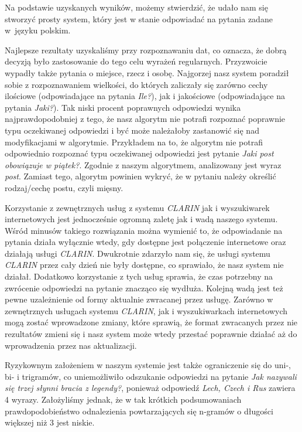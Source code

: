 Na podstawie uzyskanych wyników, możemy stwierdzić, że udało nam się stworzyć prosty system, który jest w stanie odpowiadać na pytania zadane w~języku polskim.

Najlepsze rezultaty uzyskaliśmy przy rozpoznawaniu dat, co oznacza, że dobrą decyzją było zastosowanie do tego celu wyrażeń regularnych. Przyzwoicie wypadły także pytania o miejsce, rzecz i osobę. Najgorzej nasz system poradził sobie z rozpoznawaniem wielkości, do których zaliczały się zarówno cechy ilościowe (odpowiadające na pytania \emph{Ile?}), jak i jakościowe (odpowiadające na pytania \emph{Jaki?}). Tak niski procent poprawnych odpowiedzi wynika najprawdopodobniej z tego, że nasz algorytm nie potrafi rozpoznać poprawnie typu oczekiwanej odpowiedzi i być może należałoby zastanowić się nad modyfikacjami w algorytmie. Przykładem na to, że algorytm nie potrafi odpowiednio rozpoznać typu oczekiwanej odpowiedzi jest pytanie \emph{Jaki post obowiązuje w piątek?}. Zgodnie z naszym algorytmem, analizowany jest wyraz \emph{post}. Zamiast tego, algorytm powinien wykryć, że w pytaniu należy określić rodzaj/cechę postu, czyli mięsny.

Korzystanie z zewnętrznych usług z systemu \emph{CLARIN} jak i wyszukiwarek internetowych jest jednocześnie ogromną zaletę jak i wadą naszego systemu. Wśród minusów takiego rozwiązania można wymienić to, że odpowiadanie na pytania działa wyłącznie wtedy, gdy dostępne jest połączenie internetowe oraz działają usługi \emph{CLARIN}. Dwukrotnie zdarzyło nam się, że usługi systemu \emph{CLARIN} przez cały dzień nie były dostępne, co sprawiało, że nasz system nie działał. Dodatkowo korzystanie z tych usług sprawia, że czas potrzebny na zwrócenie odpowiedzi na pytanie znacząco się wydłuża. Kolejną wadą jest też pewne uzależnienie od formy aktualnie zwracanej przez usługę. Zarówno w zewnętrznych usługach systemu \emph{CLARIN}, jak i wyszukiwarkach internetowych mogą zostać wprowadzone zmiany, które sprawią, że format zwracanych przez nie rezultatów zmieni się i nasz system może wtedy przestać poprawnie działać aż do wprowadzenia przez nas aktualizacji. 

Ryzykownym założeniem w naszym systemie jest także ograniczenie się do uni-, bi- i trigramów, co uniemożliwiło odszukanie odpowiedzi na pytanie \emph{Jak nazywali się trzej słynni bracia z legendy?}, ponieważ odpowiedź \emph{Lech, Czech i Rus} zawiera 4 wyrazy. Założyliśmy jednak, że w tak krótkich podsumowaniach prawdopodobieństwo odnalezienia powtarzających się n-gramów o długości większej niż 3 jest niskie.

